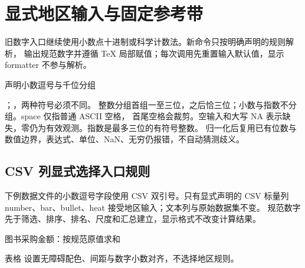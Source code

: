 \section{显式地区输入与固定参考带}
旧数字入口继续使用小数点十进制或科学计数法。新命令只按明确声明的规则解析，
输出规范数字并遵循 TeX 局部赋值；每次调用先重置输入默认值，显示 formatter 不参与解析。
\begin{example}[text and listing,sidebyside=false]{声明小数逗号与千位分组}
\gradbar[max=2000,width=55mm,precision=1]{\purchaseAmount}
\end{example}
；，两种符号必须不同。
整数分组首组一至三位，之后恰三位；小数与指数不分组。space 仅指普通 ASCII 空格，
首尾空格会裁剪。空输入和大写 NA 表示缺失，零仍为有效观测。指数是最多三位的有符号整数。
归一化后复用已有位数与数值边界，表达式、单位、NaN、无穷仍报错，不自动猜测歧义。
\subsection{CSV 列显式选择入口规则}
下例数据文件的小数逗号字段使用 CSV 双引号。只有显式声明的 CSV 标量列
number、bar、bullet、heat 接受地区输入；文本列与原始数据集不变。
规范数字先于筛选、排序、排名、尺度和汇总建立，显示格式不改变计算结果。
\begin{example}[text and listing,sidebyside=false]{图书采购金额：按规范原值求和}
\begin{center}
\begin{gradtable}[data=purchases,style=regional]
\end{gradtable}
\end{center}
\end{example}
表格  设置无障碍配色、间距与数字小数对齐，不选择地区规则。
\clearpage
